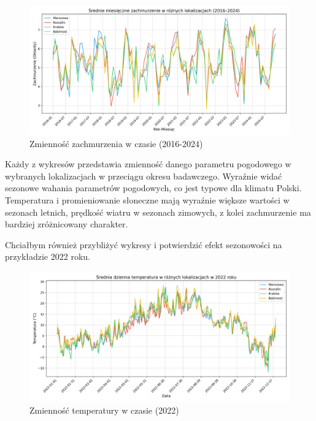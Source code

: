 \begin{figure}[H]
    \centering
    \includegraphics[width=\textwidth]{../plots/weather/cloud_cover_time_series_full.png}
    \caption{Zmienność zachmurzenia w czasie (2016-2024)}
    \label{fig:cloud-cover-time-series-full}
\end{figure}

Każdy z wykresów przedstawia zmienność danego parametru pogodowego w wybranych lokalizacjach w przeciągu okresu badawczego. Wyraźnie widać sezonowe wahania parametrów pogodowych, co jest typowe dla klimatu Polski. Temperatura i promieniowanie słoneczne mają wyraźnie większe wartości w sezonach letnich, prędkość wiatru w sezonach zimowych, z kolei zachmurzenie ma bardziej zróżnicowany charakter.

Chciałbym również przybliżyć wykresy i potwierdzić efekt sezonowości na przykładzie 2022 roku. 

\begin{figure}[H]
    \centering
    \includegraphics[width=\textwidth]{../plots/weather/temp_time_series_2022.png}
    \caption{Zmienność temperatury w czasie (2022)}
    \label{fig:temp-time-series-2022}
\end{figure}

